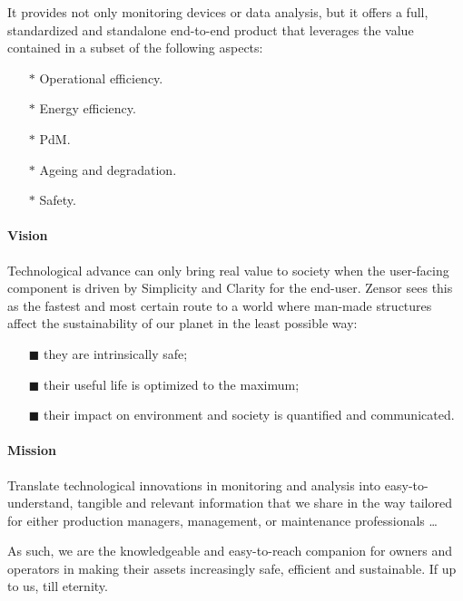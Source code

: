 It provides not only monitoring devices or data analysis, but it offers a full, standardized and standalone end-to-end product that leverages the value contained in a subset of the following aspects:
\begin{multicols}{2}
    \begin{itemize} 
        \item[$\ast$] Operational efficiency.
        \item[$\ast$] Energy efficiency. 
        \item[$\ast$] \acl{PdM}.
        \item[$\ast$] Ageing and degradation.
        \item[$\ast$] Safety.
    \end{itemize}
\end{multicols}

\paragraph{Vision} 
Technological advance can only bring real value to society when the user-facing component is driven by Simplicity and Clarity for the end-user. 
Zensor sees this as the fastest and most certain route to a world where man-made structures affect the sustainability of our planet in the least possible way:
\begin{enumerate}
    \item[$\blacksquare$] they are intrinsically safe;
    \item[$\blacksquare$] their useful life is optimized to the maximum;
    \item[$\blacksquare$] their impact on environment and society is quantified and communicated.
\end{enumerate}

\paragraph{Mission}


Translate technological innovations in monitoring and analysis into easy-to-understand, tangible and relevant information that we share in the way tailored for either production managers,
management, or maintenance professionals \dots \par
As such, we are the knowledgeable and easy-to-reach companion for owners and operators in making their assets increasingly safe, efficient and sustainable. If up to us, till eternity.
